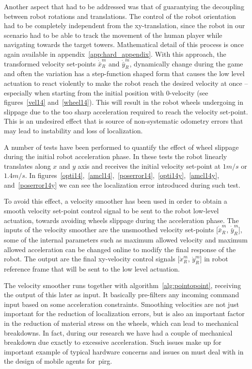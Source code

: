 Another aspect that had to be addressed was that of guarantying the decoupling between robot rotations and translations. The control of the robot orientation had to be completely independent from the xy-translation, since the robot in our scenario had to be able to track the movement of the human player while navigating towards the target towers. Mathematical detail of this process is once again available in appendix~\ref{app:hard_appendix}. With this approach, the transformed velocity set-points $\dot{\bar{x}}_R^m$ and $\dot{\bar{y}}_R^m$, dynamically change during the game and often the variation has a step-function shaped form that causes the low level actuation to react violently to make the robot reach the desired velocity at once -- especially when starting from the initial position with 0-velocity (see figures~\ref{vel14} and~\ref{wheel14}). This will result in the robot wheels undergoing in slippage due to the too sharp acceleration required to reach the velocity set-point. This is an undesired effect that is source of non-systematic odometry errors that may lead to instability and loss of localization. 

A number of tests have been performed to quantify the effect of wheel slippage during the initial robot acceleration phase. In these tests the robot linearly translates along $x$ and $y$ axis and receives the initial velocity set-point at $1m/s$ or $1.4m/s$. In figures~\ref{opti14},~\ref{amcl14},~\ref{poserror14},~\ref{opti14y},~\ref{amcl14y}, and~\ref{poserror14y} we can see the localization error introduced during such test.

To avoid this effect, a velocity smoother has been used in order to obtain a smooth velocity set-point control signal to be sent to the robot low-level actuation, towards avoiding wheels slippage during the acceleration phase. The inputs of the velocity smoother are the unsmoothed velocity set-points [$\dot{\bar{x}}_R^m$, $\dot{\bar{y}}_R^m$], some of the internal parameters such as maximum allowed velocity and maximum allowed acceleration can be changed online to modify the final response of the robot. The output are the final xy-velocity control signals [$\dot{x}_R^m$, $\dot{y}_R^m$] in robot reference frame that will be sent to the low level actuation.

The velocity smoother runs together with algorithm~\ref{alg:pointopoint}, receiving the output of this later as input. It basically pre-filters any incoming command input based on some acceleration constraints. Smoothing velocities are not just important for the reduction of localization errors, but is also an important factor in the reduction of material stress on the wheels, which can lead to mechanical breakdowns. In fact, during our research we have had a couple of mechanical breakdown due exactly to excessive acceleration. Such issues make up for important example of typical hardware concerns and issues on must deal with in the design of mobile agents for~\gls{pirg}.

